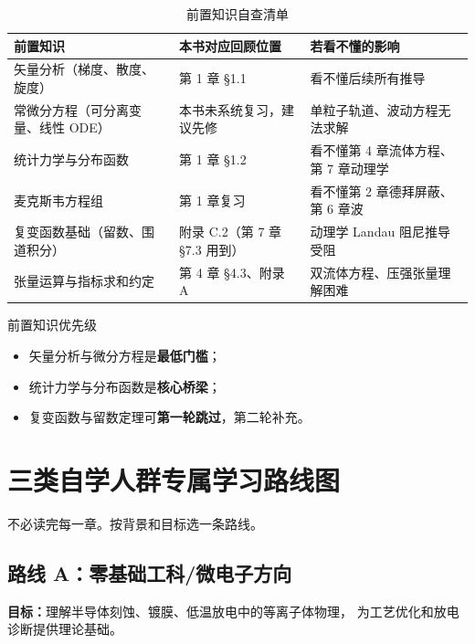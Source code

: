 \documentclass[12pt,a4paper,openany,oneside]{book}
\begin{document}
\begin{table}[htbp]
\centering
\caption{前置知识自查清单}
\small
\begin{tabular}{@{}p{4.2cm}p{3cm}p{5.2cm}@{}}
\toprule
\textbf{前置知识} & \textbf{本书对应回顾位置} & \textbf{若看不懂的影响} \\
\midrule
矢量分析（梯度、散度、旋度） & 第 1 章 \S 1.1 & 看不懂后续所有推导 \\
常微分方程（可分离变量、线性 ODE） & 本书未系统复习，建议先修 & 单粒子轨道、波动方程无法求解 \\
统计力学与分布函数 & 第 1 章 \S 1.2 & 看不懂第 4 章流体方程、第 7 章动理学 \\
麦克斯韦方程组 & 第 1 章复习 & 看不懂第 2 章德拜屏蔽、第 6 章波 \\
复变函数基础（留数、围道积分） & 附录 C.2（第 7 章 \S 7.3 用到） & 动理学 Landau 阻尼推导受阻 \\
张量运算与指标求和约定 & 第 4 章 \S 4.3、附录 A & 双流体方程、压强张量理解困难 \\
\bottomrule
\end{tabular}
\end{table}

\begin{review}{前置知识优先级}{}
\begin{itemize}
\item 矢量分析与微分方程是\textbf{最低门槛}；
\item 统计力学与分布函数是\textbf{核心桥梁}；
\item 复变函数与留数定理可\textbf{第一轮跳过}，第二轮补充。
\end{itemize}
\end{review}


\section*{三类自学人群专属学习路线图}
{}

不必读完每一章。按背景和目标选一条路线。


\subsection*{路线 A：零基础工科/微电子方向}

\textbf{目标：}理解半导体刻蚀、镀膜、低温放电中的等离子体物理，
为工艺优化和放电诊断提供理论基础。
\end{document}
